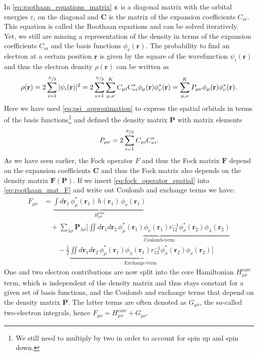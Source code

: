 In \autoref{eq:roothaan_equations_matrix} $\boldsymbol{\varepsilon}$ is a diagonal matrix with the orbital energies $\varepsilon_i$ on the diagonal and $\mathbf{C}$ is the matrix of the expansion coefficients $C_{\nu i}$. This equation is called the Roothaan equations and can be solved iteratively. \\
Yet, we still are missing a representation of the density in terms of the expansion coefficients $C_{\nu i}$ and the basis functions $\phi_\nu(\mathbf{r})$. The probability to find an electron at a certain position $\mathbf{r}$ is given by the square of the wavefunction $\psi_i(\mathbf{r})$ and thus the electron density $\rho(\mathbf{r})$ can be written as
\begin{equation}
    \rho(\mathbf{r}) = 2 \sum_{i=1}^{\nicefrac{N}{2}} |\psi_i(\mathbf{r})|^2 = 2 \sum_{i=1}^{\nicefrac{N}{2}} \sum_{\mu,\nu}^{K} C_{\mu i} C_{\nu i}^* \phi_\mu(\mathbf{r}) \phi_\nu^*(\mathbf{r}) = \sum_{\mu,\nu}^{K} P_{\mu \nu} \phi_\mu(\mathbf{r}) \phi_\nu^*(\mathbf{r}).
\end{equation}
Here we have used \autoref{eq:psi_approximation} to express the spatial orbitals in terms of the basis functions\footnote{We still need to multiply by two in order to account for spin up and spin down.} and defined the density matrix $\mathbf{P}$ with matrix elements
\begin{equation}
    \label{eq:density_matrix}
    P_{\mu \nu} = 2 \sum_{i=1}^{\nicefrac{N}{2}} C_{\mu i} C_{\nu i}^*.
\end{equation}
As we have seen earlier, the Fock operator $F$ and thus the Fock matrix $\mathbf{F}$ depend on the expansion coefficients $\mathbf{C}$ and thus the Fock matrix also depends on the density matrix $\mathbf{F(P)}$. If we insert \autoref{eq:fock_operator_spatial} into \autoref{eq:roothaan_mat_F} and write out Coulomb and exchange terms we have: 
\begin{align}
    \label{eq:fock_full_eq_coul_ex}
        F_{\mu \nu} &= \underbrace{\int d\mathbf{r}_1\, \phi_\mu^*(\mathbf{r}_1)\, h(\mathbf{r}_1)\, \phi_\nu(\mathbf{r}_1) \nonumber}_{H_{\mu\nu}^\text{core}} \\
        &\quad + \sum_{\lambda \sigma} \mathbf{P}_{\lambda \sigma} \Bigg[
            \underbrace{\iint  d\mathbf{r}_1 d\mathbf{r}_2\, \phi_\mu^*(\mathbf{r}_1) \phi_\nu(\mathbf{r}_1) r_{12}^{-1} \phi_\sigma^*(\mathbf{r}_2) \phi_\lambda(\mathbf{r}_2) \nonumber}_{\text{Coulomb-term}} \\
            &\qquad - \frac{1}{2} \underbrace{\iint d\mathbf{r}_1 d\mathbf{r}_2\, \phi_\mu^*(\mathbf{r}_1) \phi_\lambda(\mathbf{r}_1) r_{12}^{-1} \phi_\sigma^*(\mathbf{r}_2) \phi_\nu(\mathbf{r}_2)}_{\text{Exchange-term}}
            \Bigg]
\end{align}
One and two electron contributions are now split into the core Hamiltonian $H_{\mu\nu}^\text{core}$ term, which is independent of the density matrix and thus stays constant for a given set of basis functions, and the Coulomb and exchange terms that depend on the density matrix $\mathbf{P}$. The latter terms are often denoted as $G_{\mu\nu}$, the so-called two-electron integrals, hence $F_{\mu \nu} = H_{\mu\nu}^\text{core} + G_{\mu\nu}$.

